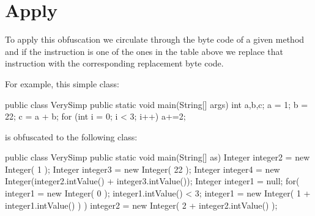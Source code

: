 \section{Apply}
To apply this obfuscation we circulate through the byte code of a 
given method and if the
instruction is one of the ones in the table above we replace that instruction
with the corresponding replacement byte code.

For example, this simple class:
\begin{listing}{1}
public class VerySimp {
   public static void main(String[] args) {
      int a,b,c;
      a = 1;
      b = 22;
      c = a + b;
      for (int i = 0; i < 3; i++) {
         a+=2;
      }
   }
}
\end{listing}

is obfuscated to the following class:
\begin{listing}{1}
public class VerySimp {
   public static void main(String[] as)
   {
      Integer integer2 = new Integer( 1 );
      Integer integer3 = new Integer( 22 );
      Integer integer4 = new Integer(integer2.intValue() + integer3.intValue());
      Integer integer1 = null;
      for( integer1 = new Integer( 0 ); integer1.intValue() < 3;
           integer1 = new Integer( 1 + integer1.intValue() ) )
         integer2 = new Integer( 2 + integer2.intValue() );
   }
}

\end{listing}

